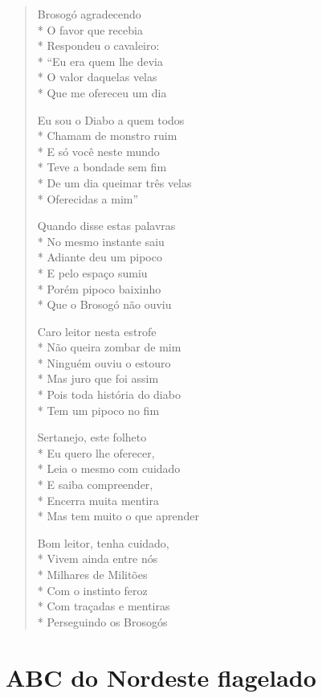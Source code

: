 \begin{verse}
Brosogó agradecendo\\*
O favor que recebia\\*
Respondeu o cavaleiro:\\*
``Eu era quem lhe devia\\*
O valor daquelas velas\\*
Que me ofereceu um dia

Eu sou o Diabo a quem todos\\*
Chamam de monstro ruim\\*
E só você neste mundo\\*
Teve a bondade sem fim\\*
De um dia queimar três velas\\*
Oferecidas a mim''

Quando disse estas palavras\\*
No mesmo instante saiu\\*
Adiante deu um pipoco\\*
E pelo espaço sumiu\\*
Porém pipoco baixinho\\*
Que o Brosogó não ouviu

Caro leitor nesta estrofe\\*
Não queira zombar de mim\\*
Ninguém ouviu o estouro\\*
Mas juro que foi assim\\*
Pois toda história do diabo\\*
Tem um pipoco no fim

Sertanejo, este folheto\\*
Eu quero lhe oferecer,\\*
Leia o mesmo com cuidado\\*
E saiba compreender,\\*
Encerra muita mentira\\*
Mas tem muito o que aprender

Bom leitor, tenha cuidado,\\*
Vivem ainda entre nós\\*
Milhares de Militões\\*
Com o instinto feroz\\*
Com traçadas e mentiras\\*
Perseguindo os Brosogós

\end{verse}

\chapter{ABC do Nordeste flagelado}

